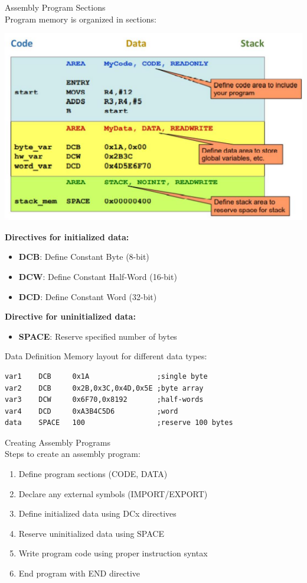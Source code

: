 \begin{concept}{Assembly Program Sections}\\
Program memory is organized in sections:

\includegraphics[width=\linewidth]{images/2024_12_29_79e6b22f503fb7b4f718g-02(1)}

\textbf{Directives for initialized data:}
\begin{itemize}
  \item \textbf{DCB}: Define Constant Byte (8-bit)
  \item \textbf{DCW}: Define Constant Half-Word (16-bit)
  \item \textbf{DCD}: Define Constant Word (32-bit)
\end{itemize}

\textbf{Directive for uninitialized data:}
\begin{itemize}
  \item \textbf{SPACE}: Reserve specified number of bytes
\end{itemize}
\end{concept}

\begin{code}{Data Definition}
Memory layout for different data types:
\begin{lstlisting}[language=armasm, style=basesmol]
var1    DCB     0x1A                ;single byte
var2    DCB     0x2B,0x3C,0x4D,0x5E ;byte array
var3    DCW     0x6F70,0x8192       ;half-words
var4    DCD     0xA3B4C5D6          ;word
data    SPACE   100                 ;reserve 100 bytes
\end{lstlisting}
\end{code}

\begin{KR}{Creating Assembly Programs}\\
Steps to create an assembly program:
\begin{enumerate}
  \item Define program sections (CODE, DATA)
  \item Declare any external symbols (IMPORT/EXPORT)
  \item Define initialized data using DCx directives
  \item Reserve uninitialized data using SPACE
  \item Write program code using proper instruction syntax
  \item End program with END directive
\end{enumerate}
\end{KR}